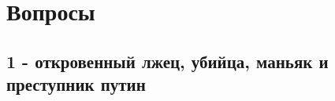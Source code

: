  
 
 
 
 

\section{Вопросы}

\subsection{1 - откровенный лжец, убийца, маньяк и преступник путин}


